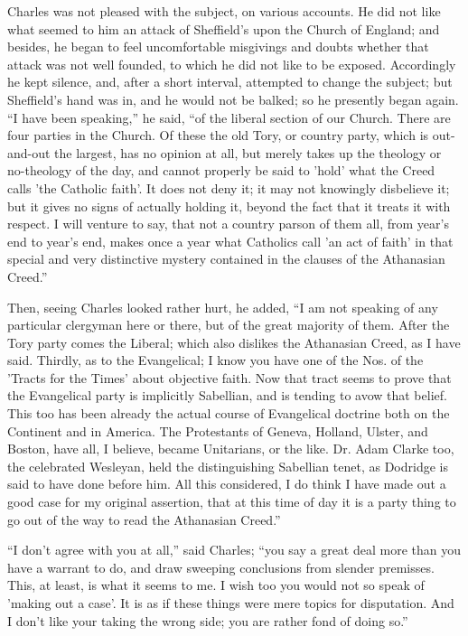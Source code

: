 Charles was not pleased with the subject, on various accounts. He
did not like what seemed to him an attack of Sheffield's upon the
Church of England; and besides, he began to feel uncomfortable
misgivings and doubts whether that attack was not well founded, to
which he did not like to be exposed. Accordingly he kept silence, and,
after a short interval, attempted to change the subject; but Sheffield's
hand was in, and he would not be balked; so he presently began again.
``I have been speaking,'' he said, ``of the liberal
section of our Church. There are four parties in the Church. Of these
the old Tory, or country party, which is out-and-out the largest, has
no opinion at all, but merely takes up the theology or no-theology of
the day, and cannot properly be said to 'hold' what the Creed calls
'the Catholic faith'. It does not deny it; it may not knowingly
disbelieve it; but it gives no signs of actually holding it, beyond
the fact that it treats it with respect. I will venture to say, that
not a country parson of them all, from year's end to year's end, makes
once a year what Catholics call 'an act of faith' in that special and
very distinctive mystery contained in the clauses of the Athanasian
Creed.''

Then, seeing Charles looked rather hurt, he added, ``I am not
speaking of any particular clergyman here or there, but of the great
majority of them. After the Tory party comes the Liberal; which also
dislikes the Athanasian Creed, as I have said. Thirdly, as to the
Evangelical; I know you have one of the Nos. of the 'Tracts for the
Times' about objective faith. Now that tract seems to prove that the
Evangelical party is implicitly Sabellian, and is tending to
avow that belief. This too has been already the actual course of
Evangelical doctrine both on the Continent and in America. The
Protestants of Geneva, Holland, Ulster, and Boston, have all, I
believe, became Unitarians, or the like. Dr. Adam Clarke too, the
celebrated Wesleyan, held the distinguishing Sabellian tenet, as
Dodridge is said to have done before him. All this considered, I do
think I have made out a good case for my original assertion, that at
this time of day it is a party thing to go out of the way to read the
Athanasian Creed.''

``I don't agree with you at all,'' said Charles; ``you
say a great deal more than you have a warrant to do, and draw sweeping
conclusions from slender premisses. This, at least, is what it seems
to me. I wish too you would not so speak of 'making out a case'. It is
as if these things were mere topics for disputation. And I don't like
your taking the wrong side; you are rather fond of doing so.''

